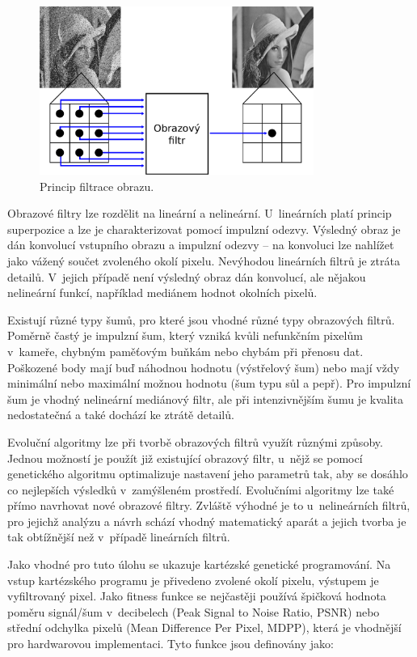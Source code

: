 \begin{figure}[htb]
    \centering\includegraphics[width=0.8\textwidth]{fig/filter.pdf}
    \caption{Princip filtrace obrazu.}
    \label{obrIFokoli}
\end{figure}

Obrazové filtry lze rozdělit na lineární a nelineární. U~lineárních platí princip superpozice a lze je charakterizovat pomocí impulzní odezvy. Výsledný obraz je dán konvolucí vstupního obrazu a impulzní odezvy -- na konvoluci lze nahlížet jako vážený součet zvoleného okolí pixelu. Nevýhodou lineárních filtrů je ztráta detailů. V~jejich případě není výsledný obraz dán konvolucí, ale nějakou nelineární funkcí, například mediánem hodnot okolních pixelů.

Existují různé typy šumů, pro které jsou vhodné různé typy obrazových filtrů. Poměrně častý je impulzní šum, který vzniká kvůli nefunkčním pixelům v~kameře, chybným paměťovým buňkám nebo chybám při přenosu dat. Poškozené body mají buď náhodnou hodnotu (výstřelový šum) nebo mají vždy minimální nebo maximální možnou hodnotu (šum typu sůl a pepř). Pro impulzní šum je vhodný nelineární mediánový filtr, ale při intenzivnějším šumu je kvalita nedostatečná a také dochází ke ztrátě detailů.

Evoluční algoritmy lze při tvorbě obrazových filtrů využít různými způsoby. Jednou možností je použít již existující obrazový filtr, u~nějž se pomocí genetického algoritmu optimalizuje nastavení jeho parametrů tak, aby se dosáhlo co nejlepších výsledků v~zamýšleném prostředí. Evolučními algoritmy lze také přímo navrhovat nové obrazové filtry. Zvláště výhodné je to u~nelineárních filtrů, pro jejichž analýzu a návrh schází vhodný matematický aparát a jejich tvorba je tak obtížnější než v~případě lineárních filtrů.

Jako vhodné pro tuto úlohu se ukazuje kartézské genetické programování. Na vstup kartézského programu je přivedeno zvolené okolí pixelu, výstupem je vyfiltrovaný pixel. Jako fitness funkce se nejčastěji používá špičková hodnota poměru signál/šum v~decibelech (Peak Signal to Noise Ratio, PSNR) nebo střední odchylka pixelů (Mean Difference Per Pixel, MDPP), která je vhodnější pro hardwarovou implementaci. Tyto funkce jsou definovány jako:

